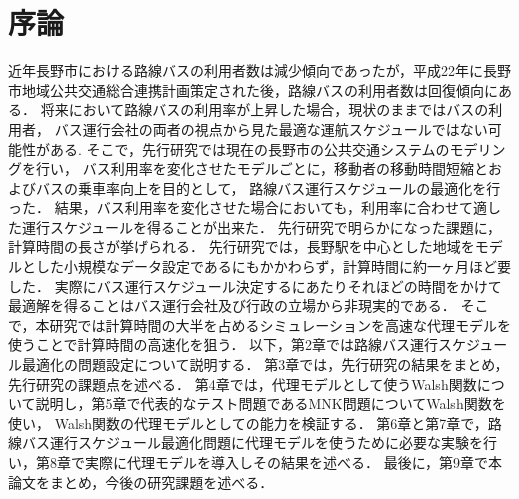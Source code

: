 \documentclass[main]{subfiles}
\begin{document}
\chapter{序論}
近年長野市における路線バスの利用者数は減少傾向であったが，平成22年に長野市地域公共交通総合連携計画策定された後，路線バスの利用者数は回復傾向にある．\cite{naganokeikaku}
将来において路線バスの利用率が上昇した場合，現状のままではバスの利用者，
バス運行会社の両者の視点から見た最適な運航スケジュールではない可能性がある.
そこで，先行研究では現在の長野市の公共交通システムのモデリングを行い，
バス利用率を変化させたモデルごとに，移動者の移動時間短縮とおよびバスの乗車率向上を目的として，
路線バス運行スケジュールの最適化を行った．\cite{senkoukenkyu}
結果，バス利用率を変化させた場合においても，利用率に合わせて適した運行スケジュールを得ることが出来た．
先行研究で明らかになった課題に，計算時間の長さが挙げられる．
先行研究では，長野駅を中心とした地域をモデルとした小規模なデータ設定であるにもかかわらず，計算時間に約一ヶ月ほど要した．
実際にバス運行スケジュール決定するにあたりそれほどの時間をかけて最適解を得ることはバス運行会社及び行政の立場から非現実的である．
そこで，本研究では計算時間の大半を占めるシミュレーションを高速な代理モデルを使うことで計算時間の高速化を狙う．
以下，第2章では路線バス運行スケジュール最適化の問題設定について説明する．
第3章では，先行研究の結果をまとめ，先行研究の課題点を述べる．
第4章では，代理モデルとして使うWalsh関数について説明し，第5章で代表的なテスト問題であるMNK問題についてWalsh関数を使い，
Walsh関数の代理モデルとしての能力を検証する．
第6章と第7章で，路線バス運行スケジュール最適化問題に代理モデルを使うために必要な実験を行い，第8章で実際に代理モデルを導入しその結果を述べる．
最後に，第9章で本論文をまとめ，今後の研究課題を述べる．
\end{document}
